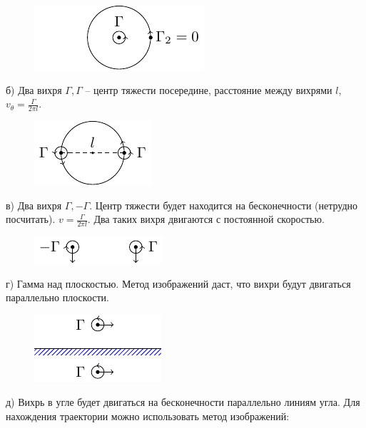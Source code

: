 \begin{figure}[H]
    \centering
    \includegraphics[scale=1.75]{img/oneG}
    \caption{}
    \label{fig:oneG}
\end{figure}

б) Два вихря $\Gamma, \Gamma$ -- центр тяжести посередине, расстояние между вихрями $l$, $v_\theta=\frac{\Gamma}{2\pi l}$.

\begin{figure}[H]
    \centering
    \includegraphics[scale=1.75]{img/twoG}
    \caption{}
    \label{fig:twoG}
\end{figure}

в) Два вихря $\Gamma, -\Gamma$. Центр тяжести будет находится на бесконечности (нетрудно посчитать). $v=\frac{\Gamma}{2\pi l}$. Два таких вихря двигаются с постоянной скоростью.

\begin{figure}[H]
    \centering
    \includegraphics[scale=1.75]{img/3G}
    \caption{}
    \label{fig:3G}
\end{figure}

г) Гамма над плоскостью. Метод изображений даст, что вихри будут двигаться параллельно плоскости.

\begin{figure}[H]
    \centering
    \includegraphics[scale=1.75]{img/4g1}
    \caption{}
    \label{fig:figure1}
\end{figure}

д) Вихрь в угле будет двигаться на бесконечности параллельно линиям угла. Для нахождения траектории можно использовать метод изображений:

